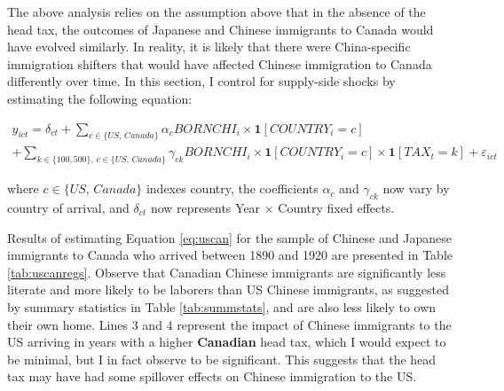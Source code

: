 \documentclass[12pt]{article}
\begin{document}
The above analysis relies on the assumption above that in the absence of the head tax, the outcomes of Japanese and Chinese immigrants to Canada would have evolved similarly. In reality, it is likely that there were China-specific immigration shifters that would have affected Chinese immigration to Canada differently over time. In this section, I control for supply-side shocks by estimating the following equation:

\begin{multline}
    \label{eq:uscan}
    y_{ict} = \delta_{ct} + \sum_{c \in \{US, \, Canada\}} \alpha_c BORNCHI_i \times \mathbf{1}[COUNTRY_i = c] \\ + \sum_{k \in \{100,500\}, \, c \in \{US, \, Canada\}} \gamma_{ck} BORNCHI_i \times \mathbf{1}[COUNTRY_i = c] \times \mathbf{1}[TAX_t = k] + \varepsilon_{ict}
\end{multline}

where $c \in \{US, \, Canada\}$ indexes country, the coefficients $\alpha_c$ and $\gamma_{ck}$ now vary by country of arrival, and $\delta_{ct}$ now represents Year $\times$ Country fixed effects. 

\begin{table}[!h]
    \centering 
    \renewcommand{\arraystretch}{1.1}
\end{table}

Results of estimating Equation \ref{eq:uscan} for the sample of Chinese and Japanese immigrants to Canada who arrived between 1890 and 1920 are presented in Table \ref{tab:uscanregs}. Observe that Canadian Chinese immigrants are significantly less literate and more likely to be laborers than US Chinese immigrants, as suggested by summary statistics in Table \ref{tab:summstats}, and are also less likely to own their own home. Lines 3 and 4 represent the impact of Chinese immigrants to the US arriving in years with a higher \textbf{Canadian} head tax, which I would expect to be minimal, but I in fact observe to be significant. This suggests that the head tax may have had some spillover effects on Chinese immigration to the US. 
\end{document}
